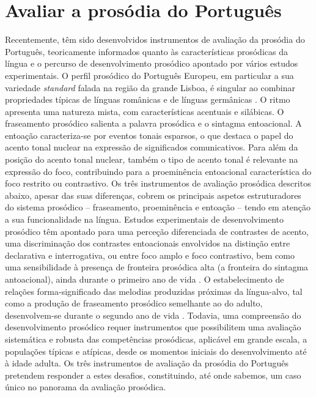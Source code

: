 \documentclass[output=paper,colorlinks,citecolor=brown,booklanguage=portuguese]{langscibook}
\begin{document}
\section{Avaliar a prosódia do Português}\label{sec:cap8sec4}
Recentemente, têm sido desenvolvidos instrumentos de avaliação da prosódia do Português, teoricamente informados quanto às características prosódicas da língua e o percurso de desenvolvimento prosódico apontado por vários estudos experimentais. O perfil prosódico do Português Europeu, em particular a sua variedade \emph{standard} falada na região da grande Lisboa, é singular ao combinar propriedades típicas de línguas românicas e de línguas germânicas \citep{Frota2000, Frota2014, Frota2001, Vigario2003, Frota2015, Vigario2019}. O ritmo apresenta uma natureza mista, com características acentuais e silábicas. O fraseamento prosódico salienta a palavra prosódica e o sintagma entoacional. A entoação caracteriza-se por eventos tonais esparsos, o que destaca o papel do acento tonal nuclear na expressão de significados comunicativos. Para além da posição do acento tonal nuclear, também o tipo de acento tonal é relevante na expressão do foco, contribuindo para a proeminência entoacional característica do foco restrito ou contrastivo. Os três instrumentos de avaliação prosódica descritos abaixo, apesar das suas diferenças, cobrem os principais aspetos estruturadores do sistema prosódico – fraseamento, proeminência e entoação – tendo em atenção a sua funcionalidade na língua. Estudos experimentais de desenvolvimento prosódico têm apontado para uma perceção diferenciada de contrastes de acento, uma discriminação dos contrastes entoacionais envolvidos na distinção entre declarativa e interrogativa, ou entre foco amplo e foco contrastivo, bem como uma sensibilidade à presença de fronteira prosódica alta (a fronteira do sintagma antoacional), ainda durante o primeiro ano de vida \citep{Frota2014a, Butler2016, Butler2018, Frota2019, Frota2020}. O estabelecimento de relações forma-significado das melodias produzidas próximas da língua-alvo, tal como a produção de fraseamento prosódico semelhante ao do adulto, desenvolvem-se durante o segundo ano de vida \citep{Frota2016b}. Todavia, uma compreensão do desenvolvimento prosódico requer instrumentos que possibilitem uma avaliação sistemática e robusta das competências prosódicas, aplicável em grande escala, a populações típicas e atípicas, desde os momentos iniciais do desenvolvimento até à idade adulta. Os três instrumentos de avaliação da prosódia do Português pretendem responder a estes desafios, constituindo, até onde sabemos, um caso único no panorama da avaliação prosódica. 
\end{document}
